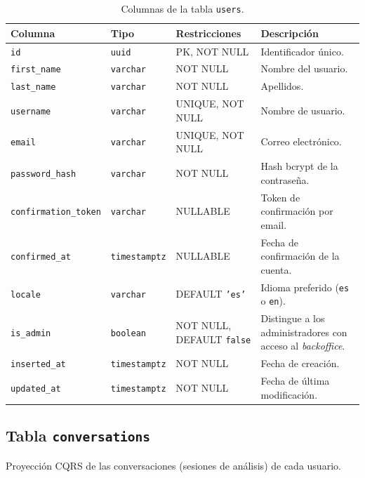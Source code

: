 \begin{table}[h]
\centering
\caption{Columnas de la tabla \texttt{users}.}
\label{tab:users}
\begin{tabular}{llp{3.5cm}p{4.5cm}}
\hline
\textbf{Columna} & \textbf{Tipo} & \textbf{Restricciones} & \textbf{Descripción} \\
\hline
\texttt{id}                  & \texttt{uuid}          & PK, NOT NULL      & Identificador único. \\
\texttt{first\_name}         & \texttt{varchar}       & NOT NULL          & Nombre del usuario. \\
\texttt{last\_name}          & \texttt{varchar}       & NOT NULL          & Apellidos. \\
\texttt{username}            & \texttt{varchar}       & UNIQUE, NOT NULL  & Nombre de usuario. \\
\texttt{email}               & \texttt{varchar}       & UNIQUE, NOT NULL  & Correo electrónico. \\
\texttt{password\_hash}      & \texttt{varchar}       & NOT NULL          & Hash bcrypt de la contraseña. \\
\texttt{confirmation\_token} & \texttt{varchar}       & NULLABLE          & Token de confirmación por email. \\
\texttt{confirmed\_at}       & \texttt{timestamptz}   & NULLABLE          & Fecha de confirmación de la cuenta. \\
\texttt{locale}              & \texttt{varchar}       & DEFAULT \texttt{'es'} & Idioma preferido (\texttt{es} o \texttt{en}). \\
\texttt{is\_admin}           & \texttt{boolean}       & NOT NULL, DEFAULT \texttt{false} & Distingue a los administradores con acceso al \emph{backoffice}. \\
\texttt{inserted\_at}        & \texttt{timestamptz}   & NOT NULL          & Fecha de creación. \\
\texttt{updated\_at}         & \texttt{timestamptz}   & NOT NULL          & Fecha de última modificación. \\
\hline
\end{tabular}
\end{table}

\subsection{Tabla \texttt{conversations}}

Proyección CQRS de las conversaciones (sesiones de análisis) de cada usuario.

